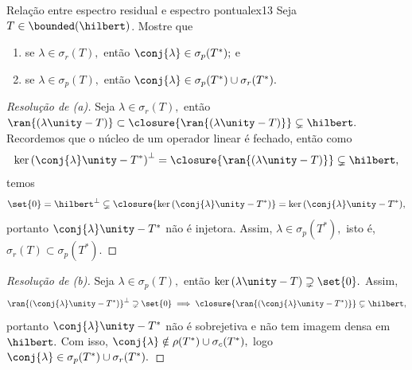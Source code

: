 \begin{exercício}{Relação entre espectro residual e espectro pontual}{ex13}
    Seja \(T \in \bounded(\hilbert)\). Mostre que
    \begin{enumerate}[label=(\alph*)]
      \item se \(\lambda \in \sigma_r(T),\) então \(\conj{\lambda} \in \sigma_p(T^*);\) e
      \item se \(\lambda \in \sigma_p(T),\) então \(\conj{\lambda} \in \sigma_p(T^*) \cup \sigma_r(T^*).\)
    \end{enumerate}
\end{exercício}
\begin{proof}[Resolução de (a)]
  Seja \(\lambda \in \sigma_r(T),\) então \(\ran{(\lambda \unity - T)} \subset \closure{\ran{(\lambda \unity - T)}} \subsetneq \hilbert.\) Recordemos que o núcleo de um operador linear é fechado, então como
  \begin{equation*}
    \ker{(\conj{\lambda}\unity - T^*)}^\perp = \closure{\ran{(\lambda \unity - T)}} \subsetneq \hilbert,
  \end{equation*}
  temos
  \begin{equation*}
    \set{0} = \hilbert^\perp \subsetneq \closure{\ker{(\conj{\lambda} \unity - T^*)}} = \ker{(\conj{\lambda}\unity - T^*)},
  \end{equation*}
  portanto \(\conj{\lambda} \unity - T^*\) não é injetora. Assim, \(\lambda \in \sigma_p(T^*),\) isto é, \(\sigma_r(T) \subset \sigma_p(T^*).\)
\end{proof}
\begin{proof}[Resolução de (b)]
  Seja \(\lambda \in \sigma_p(T),\) então \(\ker{(\lambda \unity - T)} \supsetneq \set{0}.\) Assim,
  \begin{equation*}
    \ran{(\conj{\lambda}\unity - T^*)}^\perp \supsetneq \set{0} \implies \closure{\ran{(\conj{\lambda}\unity - T^*)}} \subsetneq \hilbert,
  \end{equation*}
  portanto \(\conj{\lambda}\unity - T^*\) não é sobrejetiva e não tem imagem densa em \(\hilbert.\) Com isso, \(\conj{\lambda} \notin \rho(T^*) \cup \sigma_c(T^*),\) logo \(\conj{\lambda} \in \sigma_p(T^*) \cup \sigma_r(T^*).\)
\end{proof}
